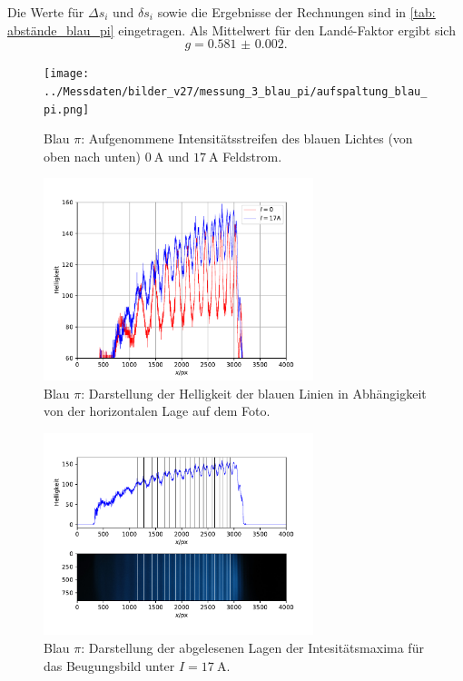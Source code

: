 Die Werte für $\Delta s_i$ und $\delta s_i$ sowie die Ergebnisse der Rechnungen sind in \autoref{tab: abstände_blau_pi} eingetragen.
Als Mittelwert für den Landé-Faktor ergibt sich
\begin{equation}
  g = \num{0.581(2)}.
\end{equation}
\begin{figure}
  \centering
  \texttt{[image: ../Messdaten/bilder\_v27/messung\_3\_blau\_pi/aufspaltung\_blau\_pi.png]}
  \caption{Blau $\pi$: Aufgenommene Intensitätsstreifen des blauen Lichtes (von oben nach unten) $\SI{0}{\ampere}$ und $\SI{17}{\ampere}$ Feldstrom.}
  \label{fig: aufspaltung_blau_pi}
\end{figure}
\begin{figure}
  \centering
  \includegraphics[width = 0.7\textwidth]{../Messdaten/plots/blau_pi_intensitaet.pdf}
  \caption{Blau $\pi$: Darstellung der Helligkeit der blauen Linien in Abhängigkeit von der horizontalen Lage auf dem Foto.}
  \label{fig: blau_intensität_pi}
\end{figure}

\begin{figure}
  \centering
  \includegraphics[width = 0.7\textwidth]{../Messdaten/plots/peaks_blau_pi_17.pdf}
  \caption{Blau $\pi$: Darstellung der abgelesenen Lagen der Intesitätsmaxima für das Beugungsbild unter $I =\SI{17}{\ampere}$.}
  \label{fig: peaks_blau_pi_17}
\end{figure}

